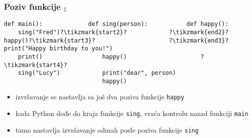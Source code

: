 \documentclass[utf8,compress,aspectratio=169]{beamer}
\begin{document}
\begin{frame}[fragile]
  \frametitle{Poziv funkcije $_5$}
\begin{verbatim}
def main():             def sing(person):           def happy():
    sing("Fred")?\tikzmark{start2}?            ?\tikzmark{end2}?happy()?\tikzmark{start3}?                     ?\tikzmark{end3}?print("Happy birthday to you!")
    print()                 happy()                     ?\tikzmark{start4}?
    sing("Lucy")            print("dear", person)
                            happy()
\end{verbatim}
\begin{itemize}
  \item izvršavanje se nastavlja sa još dva poziva funkcije \texttt{happy}
  \item kada Python dođe do kraja funkcije \texttt{sing}, vraća kontrolu nazad funkciji \texttt{main}
  \item tamo nastavlja izvršavanje odmah posle poziva funkcije \texttt{sing}
\end{itemize}
\end{frame}
\end{document}
